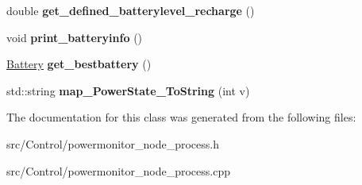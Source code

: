 \begin{DoxyCompactItemize}
\mbox{\label{classPowerMonitorNodeProcess_a2a04c10c944ed258c0d786f1b759eebc}} 
double {\bfseries get\+\_\+defined\+\_\+batterylevel\+\_\+recharge} ()
\item 
\mbox{\label{classPowerMonitorNodeProcess_a542c4c8aaff28af4e5b2c6c7a0203bbf}} 
void {\bfseries print\+\_\+batteryinfo} ()
\item 
\mbox{\label{classPowerMonitorNodeProcess_aae29e49043a6ac81d1129b28bf707b34}} 
\hyperlink{structBattery}{Battery} {\bfseries get\+\_\+bestbattery} ()
\item 
\mbox{\label{classPowerMonitorNodeProcess_a4658f923d750be2bfb046c1ae1c60c1b}} 
std\+::string {\bfseries map\+\_\+\+Power\+State\+\_\+\+To\+String} (int v)
\end{DoxyCompactItemize}


The documentation for this class was generated from the following files\+:\begin{DoxyCompactItemize}
\item 
src/\+Control/powermonitor\+\_\+node\+\_\+process.\+h\item 
src/\+Control/powermonitor\+\_\+node\+\_\+process.\+cpp\end{DoxyCompactItemize}
